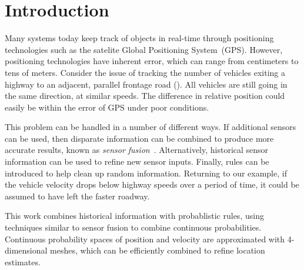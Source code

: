 \section{Introduction}

Many systems today keep track of objects in real-time through positioning technologies such as the satelite Global Positioning System~(GPS)\cite{gpsGov}.
However, positioning technologies have inherent error, which can range from centimeters to tens of meters.
Consider the issue of tracking the number of vehicles exiting a highway to an adjacent, parallel frontage road (). All vehicles are still going in the same direction, at similar speeds. The difference in relative position could easily be within the error of GPS under poor conditions.

This problem can be handled in a number of different ways. If additional sensors can be used, then disparate information can be combined to produce more accurate results, known as \textit{sensor fusion}~\cite{moravecAIM88}.
Alternatively, historical sensor information can be used to refine new sensor inputs.
Finally, rules can be introduced to help clean up random information. Returning to our example, if the vehicle velocity drops below highway speeds over a period of time, it could be assumed to have left the faster roadway.

This work combines historical information with probablistic rules, using techniques similar to sensor fusion to combine continuous probabilities. Continuous probability spaces of position and velocity are approximated with 4-dimensional meshes, which can be efficiently combined to refine location estimates.
